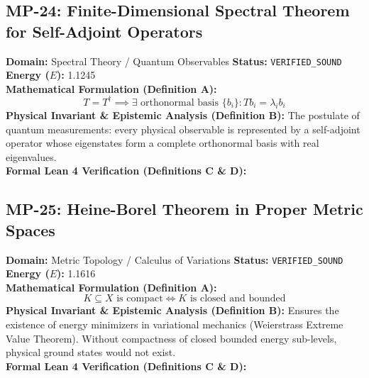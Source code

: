 \subsection{MP-24: Finite-Dimensional Spectral Theorem for Self-Adjoint Operators}
\textbf{Domain:} Spectral Theory / Quantum Observables \hfill \textbf{Status:} \texttt{VERIFIED\_SOUND} \hfill \textbf{Energy ($E$):} 1.1245\\
\textbf{Mathematical Formulation (Definition A):}
\begin{equation*}
T = T^\dagger \implies \exists \text{ orthonormal basis } \{b_i\}: T b_i = \lambda_i b_i
\end{equation*}
\textbf{Physical Invariant \& Epistemic Analysis (Definition B):}
The postulate of quantum measurements: every physical observable is represented by a self-adjoint operator whose eigenstates form a complete orthonormal basis with real eigenvalues.\\

\textbf{Formal Lean 4 Verification (Definitions C \& D):}


\vspace{1em}
\subsection{MP-25: Heine-Borel Theorem in Proper Metric Spaces}
\textbf{Domain:} Metric Topology / Calculus of Variations \hfill \textbf{Status:} \texttt{VERIFIED\_SOUND} \hfill \textbf{Energy ($E$):} 1.1616\\
\textbf{Mathematical Formulation (Definition A):}
\begin{equation*}
K \subseteq X \text{ is compact} \iff K \text{ is closed and bounded}
\end{equation*}
\textbf{Physical Invariant \& Epistemic Analysis (Definition B):}
Ensures the existence of energy minimizers in variational mechanics (Weierstrass Extreme Value Theorem). Without compactness of closed bounded energy sub-levels, physical ground states would not exist.\\

\textbf{Formal Lean 4 Verification (Definitions C \& D):}


\vspace{1em}
